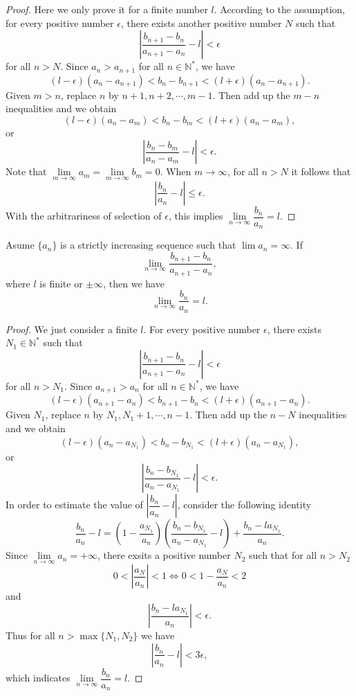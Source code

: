 \documentclass[11pt,fleqn]{book} %
\begin{document}
\begin{proof}
	Here we only prove it for a finite number $l$. According to the assumption, for every positive number $\epsilon$, there exists another positive number $N$ such that
	\[
	\left|\frac{b_{n+1}-b_n}{a_{n+1}-a_n}-l\right|<\epsilon
	\]
	for all $n>N$. Since $a_n>a_{n+1}$ for all $n\in\mathbb{N^*}$, we have
	\[
	(l-\epsilon)(a_n-a_{n+1})<b_n-b_{n+1}<(l+\epsilon)(a_n-a_{n+1}).
	\]
	Given $m>n$, replace $n$ by $n+1,n+2,\cdots,m-1$. Then add up the $m-n$ inequalities and we obtain
	\[
	(l-\epsilon)(a_n-a_m)<b_n-b_m<(l+\epsilon)(a_n-a_m),
	\]
	or
	\[
	\left|\frac{b_n-b_m}{a_n-a_m}-l\right|<\epsilon.
	\]
	Note that $\lim\limits_{m\to\infty}a_m=\lim\limits_{m\to\infty}b_m=0$. When $m\to\infty$, for all $n>N$ it follows that
	\[
	\left|\frac{b_n}{a_n}-l\right|\leqslant\epsilon.
	\]
	With the arbitrariness of selection of $\epsilon$, this implies $\lim\limits_{n\to\infty}\dfrac{b_n}{a_n}=l$.
\end{proof}

\vspace{3mm}

\begin{theorem}
	Asume $\{a_n\}$ is a strictly increasing sequence such that $\lim a_n = \infty$. If
	\[
	\lim\limits_{n\to\infty}\frac{b_{n+1}-b_n}{a_{n+1}-a_n},
	\]
	where $l$ is finite or $\pm\infty$, then we have
	\[
	\lim\limits_{n\to\infty}\frac{b_n}{a_n}=l.
	\]
\end{theorem}

\begin{proof}
	We just consider a finite $l$. For every positive number $\epsilon$, there exists $N_1\in\mathbb{N^*}$ such that
	\[
	\left|\frac{b_{n+1}-b_n}{a_{n+1}-a_n}-l\right|<\epsilon
	\]
	for all $n>N_1$. Since $a_{n+1}>a_n$ for all $n\in\mathbb{N^*}$, we have
	\[
	(l-\epsilon)(a_{n+1}-a_{n})<b_{n+1}-b_{n}<(l+\epsilon)(a_{n+1}-a_{n}).
	\]
	Given $N_1$, replace $n$ by $N_1,N_1+1,\cdots,n-1$. Then add up the $n-N$ inequalities and we obtain
	\[
	(l-\epsilon)(a_n-a_{N_1})<b_n-b_{N_1}<(l+\epsilon)(a_n-a_{N_1}),
	\]
	or
	\[
	\left|\frac{b_n-b_{N_1}}{a_n-a_{N_1}}-l\right|<\epsilon.
	\]
	In order to estimate the value of $\left|\dfrac{b_n}{a_n}-l\right|$, consider the following identity
	\[
	\frac{b_n}{a_n}-l=\left(1-\frac{a_{N_1}}{a_n}\right)\left(\frac{b_n-b_{N_1}}{a_n-a_{N_1}}-l\right)+\frac{b_n-la_{N_1}}{a_n}.
	\]
	Since $\lim\limits_{n\to\infty}a_n=+\infty$, there exsits a positive number $N_2$ such that for all $n>N_2$
	\[
	0<\left|\frac{a_N}{a_n}\right|<1\Leftrightarrow0<1-\frac{a_N}{a_n}<2
	\]
	and
	\[
	\left|\frac{b_n-la_{N_1}}{a_n}\right|<\epsilon.
	\]
	Thus for all $n>\max\{N_1,N_2\}$ we have
	\[
	\left|\dfrac{b_n}{a_n}-l\right|<3\epsilon,
	\]
	which indicates $\lim\limits_{n\to\infty}\dfrac{b_n}{a_n}=l$.

\end{proof}
\end{document}
